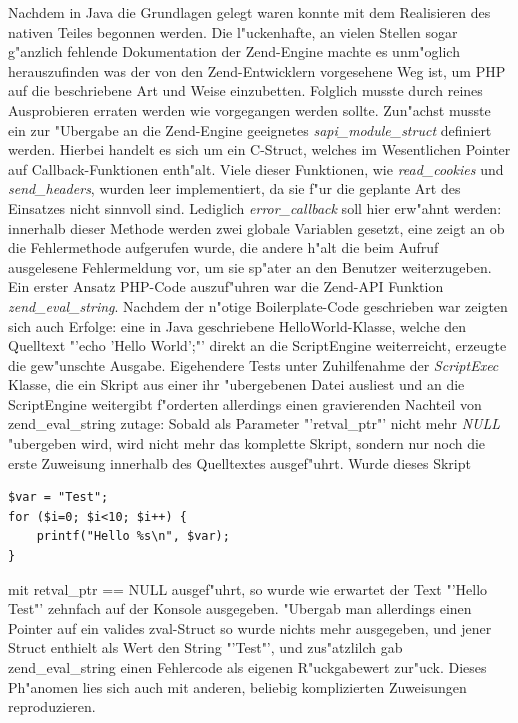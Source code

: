 Nachdem in Java die Grundlagen gelegt waren konnte mit dem Realisieren des nativen Teiles begonnen werden.
Die l"uckenhafte, an vielen Stellen sogar g"anzlich fehlende Dokumentation der Zend-Engine machte es unm"oglich
herauszufinden was der von den Zend-Entwicklern vorgesehene Weg ist, um PHP auf die beschriebene Art und Weise
einzubetten. Folglich musste durch reines Ausprobieren erraten werden wie vorgegangen werden sollte.
Zun"achst musste ein zur "Ubergabe an die Zend-Engine geeignetes \emph{sapi\_module\_struct} definiert werden.
Hierbei handelt es sich um ein C-Struct, welches im Wesentlichen Pointer auf Callback-Funktionen enth"alt.
Viele dieser Funktionen, wie \emph{read\_cookies} und \emph{send\_headers}, wurden leer implementiert, da sie f"ur 
die geplante Art des Einsatzes nicht sinnvoll sind. Lediglich \emph{error\_callback} soll hier erw"ahnt werden:
innerhalb dieser Methode werden zwei globale Variablen gesetzt, eine zeigt an ob die Fehlermethode aufgerufen wurde,
die andere h"alt die beim Aufruf ausgelesene Fehlermeldung vor, um sie sp"ater an den Benutzer weiterzugeben.
Ein erster Ansatz PHP-Code auszuf"uhren war die Zend-API Funktion \emph{zend\_eval\_string}. Nachdem der n"otige
Boilerplate-Code geschrieben war zeigten sich auch Erfolge: eine in Java geschriebene HelloWorld-Klasse, welche
den Quelltext "'echo 'Hello World';"' direkt an die ScriptEngine weiterreicht, erzeugte die gew"unschte Ausgabe.
Eigehendere Tests unter Zuhilfenahme der \emph{ScriptExec} Klasse, die ein Skript aus einer ihr "ubergebenen Datei
ausliest und an die ScriptEngine weitergibt f"orderten allerdings einen gravierenden Nachteil von zend\_eval\_string
zutage: Sobald als Parameter "'retval\_ptr"' nicht mehr \emph{NULL} "ubergeben wird, wird nicht mehr das komplette
Skript, sondern nur noch die erste Zuweisung innerhalb des Quelltextes ausgef"uhrt. Wurde dieses Skript
\begin{lstlisting}[caption=Testscript f"ur zend\_eval\_string()]
$var = "Test";
for ($i=0; $i<10; $i++) {
    printf("Hello %s\n", $var);
}
\end{lstlisting}
mit retval\_ptr == NULL ausgef"uhrt, so wurde wie erwartet der Text "'Hello Test"' zehnfach auf der Konsole
ausgegeben. "Ubergab man allerdings einen Pointer auf ein valides zval-Struct so wurde nichts mehr ausgegeben,
und jener Struct enthielt als Wert den String "'Test"', und zus"atzlilch gab zend\_eval\_string einen Fehlercode
als eigenen R"uckgabewert zur"uck. Dieses Ph"anomen lies sich auch mit anderen, beliebig komplizierten Zuweisungen 
reproduzieren.

